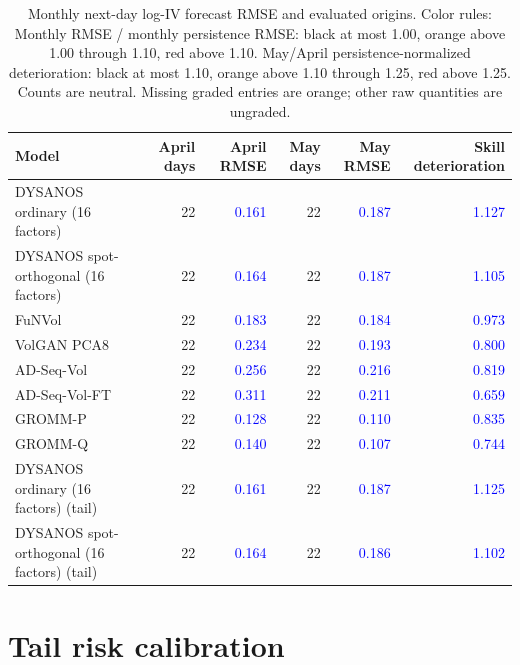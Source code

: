 \documentclass[11pt]{article}
\begin{document}
\begin{table}[H]\centering\small\setlength{\tabcolsep}{4pt}
\caption{Monthly next-day log-IV forecast RMSE and evaluated origins. Color rules: Monthly RMSE / monthly persistence RMSE: black at most 1.00, orange above 1.00 through 1.10, red above 1.10. May/April persistence-normalized deterioration: black at most 1.10, orange above 1.10 through 1.25, red above 1.25. Counts are neutral. Missing graded entries are orange; other raw quantities are ungraded.}\label{tab:monthly-errors}
\begin{tabular}{@{}lrrrrr@{}}
\toprule
Model & April days & April RMSE & May days & May RMSE & Skill deterioration \\
\midrule
DYSANOS ordinary (16 factors) & 22 & \textcolor{blue}{0.161} & 22 & \textcolor{blue}{0.187} & \textcolor{blue}{1.127} \\
DYSANOS spot-orthogonal (16 factors) & 22 & \textcolor{blue}{0.164} & 22 & \textcolor{blue}{0.187} & \textcolor{blue}{1.105} \\
FuNVol & 22 & \textcolor{blue}{0.183} & 22 & \textcolor{blue}{0.184} & \textcolor{blue}{0.973} \\
VolGAN PCA8 & 22 & \textcolor{blue}{0.234} & 22 & \textcolor{blue}{0.193} & \textcolor{blue}{0.800} \\
AD-Seq-Vol & 22 & \textcolor{blue}{0.256} & 22 & \textcolor{blue}{0.216} & \textcolor{blue}{0.819} \\
AD-Seq-Vol-FT & 22 & \textcolor{blue}{0.311} & 22 & \textcolor{blue}{0.211} & \textcolor{blue}{0.659} \\
GROMM-P & 22 & \textcolor{blue}{0.128} & 22 & \textcolor{blue}{0.110} & \textcolor{blue}{0.835} \\
GROMM-Q & 22 & \textcolor{blue}{0.140} & 22 & \textcolor{blue}{0.107} & \textcolor{blue}{0.744} \\
DYSANOS ordinary (16 factors) (tail) & 22 & \textcolor{blue}{0.161} & 22 & \textcolor{blue}{0.187} & \textcolor{blue}{1.125} \\
DYSANOS spot-orthogonal (16 factors) (tail) & 22 & \textcolor{blue}{0.164} & 22 & \textcolor{blue}{0.186} & \textcolor{blue}{1.102} \\
\bottomrule\end{tabular}\end{table}

\section{Tail risk calibration}
\end{document}
